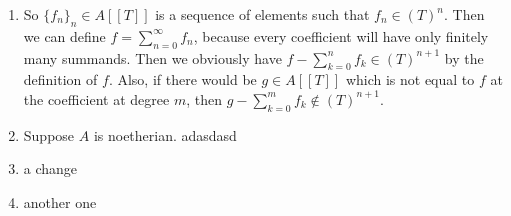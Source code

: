 \newcommand{\sheet}{3}




\maketitle

\begin{exercise}{1}
    \begin{enumerate}
        \item So $\{f_n\}_n \in A[[T]]$ is a sequence of elements such that $f_n
            \in {(T)}^n$. Then we can define $f = \sum^{\infty}_{n = 0} f_n$,
            because every coefficient will have only finitely many summands.
            Then we obviously have $f - \sum^{n}_{k = 0} f_k \in {(T)}^{n+1}$ by
            the definition of $f$. Also, if there would be $g \in A[[T]]$ which
            is not equal to $f$ at the coefficient at degree $m$, then $g -
            \sum^{m}_{k = 0} f_k \notin {(T)}^{n+1}$.
        \item Suppose $A$ is noetherian. adasdasd
        \item a change
        \item another one
    \end{enumerate}
\end{exercise}


